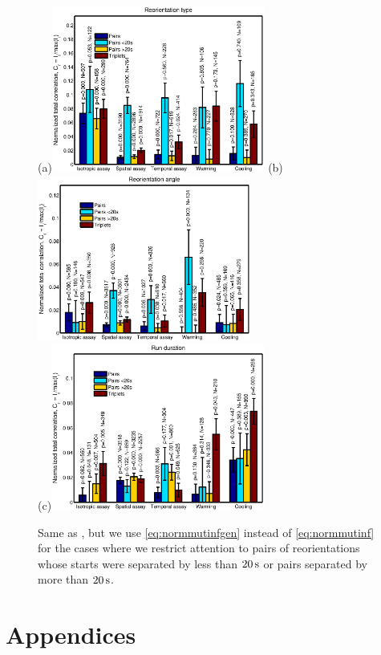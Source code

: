 \documentclass[12pt]{article}
\begin{document}
\begin{figure}
  \begin{center}
    (a)\includegraphics[width=7cm]{reotype2.eps}
    (b)\includegraphics[width=7cm]{reoangle2.eps}\\[1cm]
    (c)\includegraphics[width=7cm]{rundur2.eps}
  \end{center}
  \caption{Same as , but we use \eqref{eq:normmutinfgen} instead of \eqref{eq:normmutinf} for the cases where we restrict attention to pairs of reorientations whose starts were separated by less than $20\,\mathrm{s}$ or pairs separated by more than $20\,\mathrm{s}$.} \label{fig:results2}
\end{figure}


\appendix\section*{Appendices}
\end{document}
